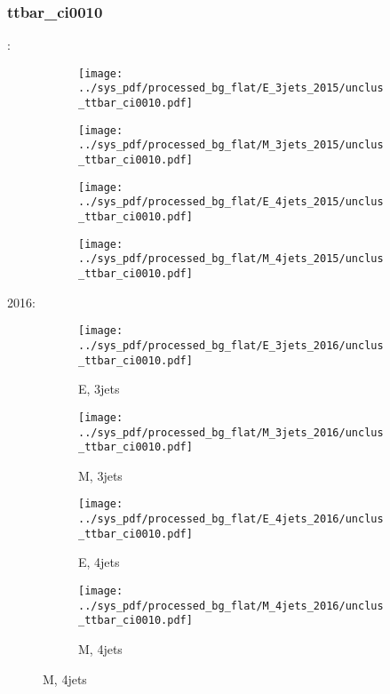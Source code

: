 \documentclass{beamer}
\begin{document}
\begin{frame}
\frametitle{ttbar_ci0010}
\fontsize{5}{1}:
\begin{figure}
\centering
\begin{subfigure}[b]{0.24\textwidth}
\texttt{[image: ../sys\_pdf/processed\_bg\_flat/E\_3jets\_2015/unclus\_ttbar\_ci0010.pdf]}
\end{subfigure}
\begin{subfigure}[b]{0.24\textwidth}
\texttt{[image: ../sys\_pdf/processed\_bg\_flat/M\_3jets\_2015/unclus\_ttbar\_ci0010.pdf]}
\end{subfigure}
\begin{subfigure}[b]{0.24\textwidth}
\texttt{[image: ../sys\_pdf/processed\_bg\_flat/E\_4jets\_2015/unclus\_ttbar\_ci0010.pdf]}
\end{subfigure}
\begin{subfigure}[b]{0.24\textwidth}
\texttt{[image: ../sys\_pdf/processed\_bg\_flat/M\_4jets\_2015/unclus\_ttbar\_ci0010.pdf]}
\end{subfigure}
\end{figure}
2016:
\begin{figure}
\centering
\begin{subfigure}[b]{0.24\textwidth}
\texttt{[image: ../sys\_pdf/processed\_bg\_flat/E\_3jets\_2016/unclus\_ttbar\_ci0010.pdf]}
\captionsetup{font=tiny}
\caption{E, 3jets}
\end{subfigure}
\begin{subfigure}[b]{0.24\textwidth}
\texttt{[image: ../sys\_pdf/processed\_bg\_flat/M\_3jets\_2016/unclus\_ttbar\_ci0010.pdf]}
\captionsetup{font=tiny}
\caption{M, 3jets}
\end{subfigure}
\begin{subfigure}[b]{0.24\textwidth}
\texttt{[image: ../sys\_pdf/processed\_bg\_flat/E\_4jets\_2016/unclus\_ttbar\_ci0010.pdf]}
\captionsetup{font=tiny}
\caption{E, 4jets}
\end{subfigure}
\begin{subfigure}[b]{0.24\textwidth}
\texttt{[image: ../sys\_pdf/processed\_bg\_flat/M\_4jets\_2016/unclus\_ttbar\_ci0010.pdf]}
\captionsetup{font=tiny}
\caption{M, 4jets}
\end{subfigure}
\end{figure}
\end{frame}
\end{document}
